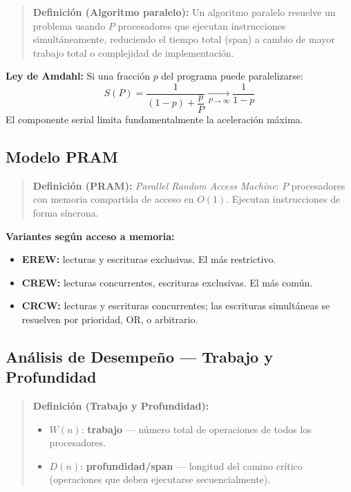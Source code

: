 \documentclass[12pt, letterpaper]{article}
\begin{document}
	\begin{quote}
		\textbf{Definición (Algoritmo paralelo):}
		Un algoritmo paralelo resuelve un problema usando $P$ procesadores que ejecutan instrucciones simultáneamente, reduciendo el tiempo total (span) a cambio de mayor trabajo total o complejidad de implementación.
	\end{quote}
	
	\textbf{Ley de Amdahl:} Si una fracción $p$ del programa puede paralelizarse:
	\[
	S(P) = \frac{1}{(1-p) + \dfrac{p}{P}} \xrightarrow[P \to \infty]{} \frac{1}{1-p}
	\]
	El componente serial limita fundamentalmente la aceleración máxima.
	
	\subsection{Modelo PRAM}
	
	\begin{quote}
		\textbf{Definición (PRAM):}
		\textit{Parallel Random Access Machine}: $P$ procesadores con memoria compartida de acceso en $O(1)$. Ejecutan instrucciones de forma síncrona.
	\end{quote}
	
	\textbf{Variantes según acceso a memoria:}
	\begin{itemize}[noitemsep]
		\item \textbf{EREW:} lecturas y escrituras exclusivas. El más restrictivo.
		\item \textbf{CREW:} lecturas concurrentes, escrituras exclusivas. El más común.
		\item \textbf{CRCW:} lecturas y escrituras concurrentes; las escrituras simultáneas se resuelven por prioridad, OR, o arbitrario.
	\end{itemize}
	
	\subsection{Análisis de Desempeño — Trabajo y Profundidad}
	
	\begin{quote}
		\textbf{Definición (Trabajo y Profundidad):}
		\begin{itemize}[noitemsep]
			\item $W(n)$: \textbf{trabajo} — número total de operaciones de todos los procesadores.
			\item $D(n)$: \textbf{profundidad/span} — longitud del camino crítico (operaciones que deben ejecutarse secuencialmente).
		\end{itemize}
	\end{quote}
	
\end{document}
